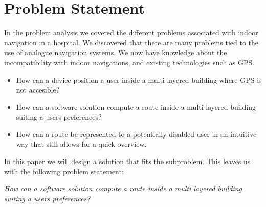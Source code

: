\chapter{Problem Statement}




In the problem analysis we covered the different problems associated with indoor navigation in a hospital.
We discovered that there are many problems tied to the use of analogue navigation systems. We now have knowledge about the incompatibility with indoor navigations, and existing technologies such as GPS.



\begin{itemize}
	\item How can a device position a user inside a multi layered building where GPS is not accesible?
	\item How can a software solution compute a route inside a multi layered building suiting a users preferences?
	\item How can a route be represented to a potentially disabled user in an intuitive way that still allows for a quick overview.
\end{itemize}

In this paper we will design a solution that fits the  subproblem. This leaves us with the following problem statement:

\begin{displayquote}
    \textit{How can a software solution compute a route inside a multi layered building suiting a users preferences?}\label{sub:problem_statement}
\end{displayquote}


